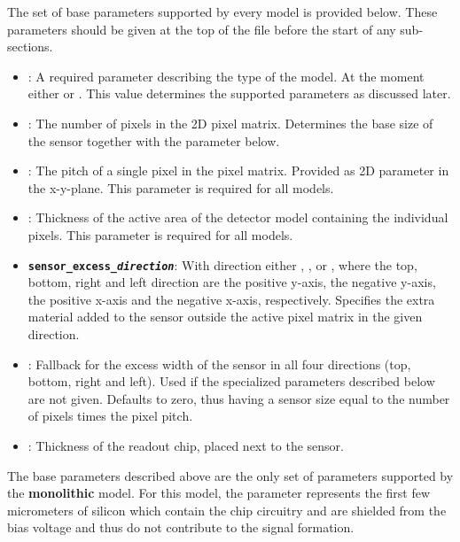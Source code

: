 The set of base parameters supported by every model is provided below.
These parameters should be given at the top of the file before the start of any sub-sections.
\begin{itemize}
\item {}: A required parameter describing the type of the model.
At the moment either  or .
This value determines the supported parameters as discussed later.
\item {}: The number of pixels in the 2D pixel matrix.
Determines the base size of the sensor together with the  parameter below.
\item {}: The pitch of a single pixel in the pixel matrix.
Provided as 2D parameter in the x-y-plane.
This parameter is required for all models.
\item {}: Thickness of the active area of the detector model containing the individual pixels.
This parameter is required for all models.
\item \texttt{\textbf{sensor\_excess\_\textit{direction}}}: With direction either , ,  or , where the top, bottom, right and left direction are the positive y-axis, the negative y-axis, the positive x-axis and the negative x-axis, respectively.
Specifies the extra material added to the sensor outside the active pixel matrix in the given direction.
\item {}: Fallback for the excess width of the sensor in all four directions (top, bottom, right and left).
Used if the specialized parameters described below are not given.
Defaults to zero, thus having a sensor size equal to the number of pixels times the pixel pitch.
\item {}: Thickness of the readout chip, placed next to the sensor.
\end{itemize}

The base parameters described above are the only set of parameters supported by the \textbf{monolithic} model. For this model, the  parameter represents the first few micrometers of silicon which contain the chip circuitry and are shielded from the bias voltage and thus do not contribute to the signal formation.

